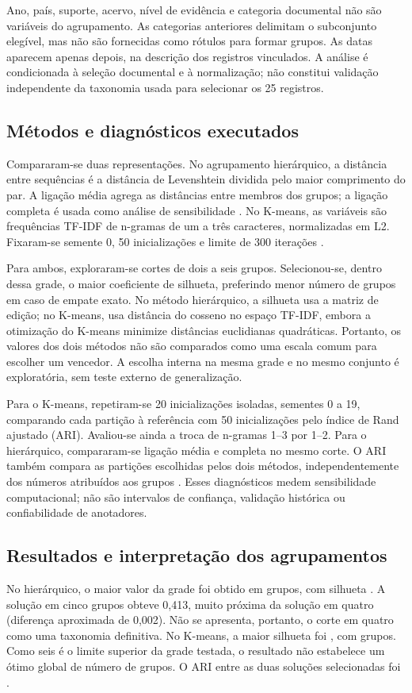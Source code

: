 Ano, país, suporte, acervo, nível de evidência e categoria documental não são variáveis do agrupamento. As categorias anteriores delimitam o subconjunto elegível, mas não são fornecidas como rótulos para formar grupos. As datas aparecem apenas depois, na descrição dos registros vinculados. A análise é condicionada à seleção documental e à normalização; não constitui validação independente da taxonomia usada para selecionar os 25 registros.

\subsection{Métodos e diagnósticos executados}
Compararam-se duas representações. No agrupamento hierárquico, a distância entre sequências é a distância de Levenshtein dividida pelo maior comprimento do par. A ligação média agrega as distâncias entre membros dos grupos; a ligação completa é usada como análise de sensibilidade \cite{scipyHierarchy2026}. No K-means, as variáveis são frequências TF-IDF de n-gramas de um a três caracteres, normalizadas em L2. Fixaram-se semente 0, 50 inicializações e limite de 300 iterações \cite{sklearnClustering2026}.

Para ambos, exploraram-se cortes de dois a seis grupos. Selecionou-se, dentro dessa grade, o maior coeficiente de silhueta, preferindo menor número de grupos em caso de empate exato. No método hierárquico, a silhueta usa a matriz de edição; no K-means, usa distância do cosseno no espaço TF-IDF, embora a otimização do K-means minimize distâncias euclidianas quadráticas. Portanto, os valores dos dois métodos não são comparados como uma escala comum para escolher um vencedor. A escolha interna na mesma grade e no mesmo conjunto é exploratória, sem teste externo de generalização.

Para o K-means, repetiram-se 20 inicializações isoladas, sementes 0 a 19, comparando cada partição à referência com 50 inicializações pelo índice de Rand ajustado (ARI). Avaliou-se ainda a troca de n-gramas 1--3 por 1--2. Para o hierárquico, compararam-se ligação média e completa no mesmo corte. O ARI também compara as partições escolhidas pelos dois métodos, independentemente dos números atribuídos aos grupos \cite{sklearnARI2026}. Esses diagnósticos medem sensibilidade computacional; não são intervalos de confiança, validação histórica ou confiabilidade de anotadores.

\subsection{Resultados e interpretação dos agrupamentos}
No hierárquico, o maior valor da grade foi obtido em \HierK{} grupos, com silhueta \HierSil{}. A solução em cinco grupos obteve 0,413, muito próxima da solução em quatro (diferença aproximada de 0,002). Não se apresenta, portanto, o corte em quatro como uma taxonomia definitiva. No K-means, a maior silhueta foi \KmeansSil{}, com \KmeansK{} grupos. Como seis é o limite superior da grade testada, o resultado não estabelece um ótimo global de número de grupos. O ARI entre as duas soluções selecionadas foi \MethodsARI{}.

